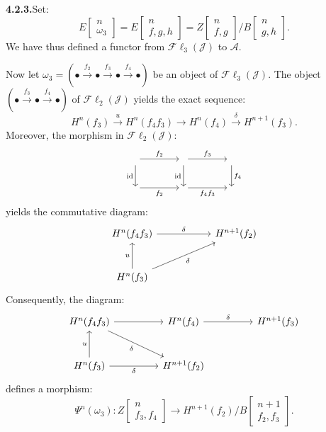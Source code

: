 \clearpage
{}%
\begingroup\small\setlength{\parskip}{0pt}\setlength{\emergencystretch}{1.5em}
\medskip\noindent\textbf{4.2.3.}\quad Set:
\[
E\!\left[\begin{smallmatrix}n\\\omega_3\end{smallmatrix}\right]
=E\!\left[\begin{smallmatrix}n\\f,g,h\end{smallmatrix}\right]
=Z\!\left[\begin{smallmatrix}n\\f,g\end{smallmatrix}\right]
\big/
B\!\left[\begin{smallmatrix}n\\g,h\end{smallmatrix}\right].
\tag{4.2.3.1}
\]
We have thus defined a functor from $\mathcal{F}\ell_3(\mathcal J)$ to
$\mathcal A$.

Now let
$\omega_3=(\mathord\bullet\xrightarrow{f_2}\mathord\bullet
\xrightarrow{f_3}\mathord\bullet\xrightarrow{f_4}\mathord\bullet)$
be an object of $\mathcal{F}\ell_3(\mathcal J)$. The object
$(\mathord\bullet\xrightarrow{f_3}\mathord\bullet\xrightarrow{f_4}\mathord\bullet)$
of $\mathcal{F}\ell_2(\mathcal J)$ yields the exact sequence:
\[
H^n(f_3)\xrightarrow u H^n(f_4f_3)\longrightarrow H^n(f_4)
\xrightarrow\delta H^{n+1}(f_3).
\]
Moreover, the morphism in $\mathcal{F}\ell_2(\mathcal J)$:
\[
\begin{tikzcd}[column sep=4em,row sep=2.2em]
{}\arrow[r,"f_2"]\arrow[d,"\operatorname{id}"']&{}
 \arrow[r,"f_3"]\arrow[d,"\operatorname{id}"']&{}\arrow[d,"f_4"]\\
{}\arrow[r,"f_2"']&{}\arrow[r,"f_4f_3"']&{}
\end{tikzcd}
\]
yields the commutative diagram:
\[
\begin{tikzcd}[column sep=5.5em,row sep=2.7em]
H^n(f_4f_3)\arrow[r,"\delta"]&H^{n+1}(f_2)\\
H^n(f_3)\arrow[u,"u"]\arrow[ur,"\delta"']&{}
\end{tikzcd}
\]
Consequently, the diagram:
\[
\begin{tikzcd}[column sep=4.5em,row sep=2.7em]
H^n(f_4f_3)\arrow[r]\arrow[dr,"\delta"']&
H^n(f_4)\arrow[r,"\delta"]&H^{n+1}(f_3)\\
H^n(f_3)\arrow[u,"u"]\arrow[r,"\delta"']&H^{n+1}(f_2)&{}
\end{tikzcd}
\]
defines a morphism:
\[
\Psi^n(\omega_3)\colon
Z\!\left[\begin{smallmatrix}n\\f_3,f_4\end{smallmatrix}\right]
\longrightarrow
H^{n+1}(f_2)\big/
B\!\left[\begin{smallmatrix}n+1\\f_2,f_3\end{smallmatrix}\right].
\]
\endgroup
